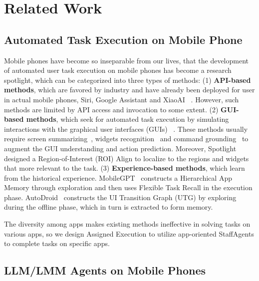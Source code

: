 \section{Related Work}
\subsection{Automated Task Execution on Mobile Phone}

Mobile phones have become so inseparable from our lives, that the development of automated user task execution on mobile phones has become a research spotlight, which can be categorized into three types of methods:
(1) \textbf{API-based methods}, which are favored by industry and have already been deployed for user in actual mobile phones, \eg Siri, Google Assistant and XiaoAI ~\cite{wen2023empowering}. However, such methods are limited by API access and invocation to some extent.
(2) \textbf{GUI-based methods}, which seek for automated task execution by simulating interactions with the graphical user interfaces (GUIs) ~\cite{li2020mapping, li2021learning, burns2022interactive, sun2022meta}. These methods usually require screen summarizing~\cite{wang2021screen2words, li2021screen2vec, zhang2021screen}, widgets recognition~\cite{li2020widget, chen2022towards} and command grounding~\cite{bai2021uibert, burns2022dataset} to augment the GUI understanding and action prediction. Moreover, Spotlight~\cite{li2023spotlight} designed a Region-of-Interest (ROI) Align to localize to the regions and widgets that more relevant to the task.
(3) \textbf{Experience-based methods}, which learn from the historical experience. MobileGPT~\cite{lee2023explore} constructs a Hierarchical App Memory through exploration and then uses Flexible Task Recall in the execution phase. AutoDroid~\cite{wen2024autodroid} constructs the UI Transition Graph (UTG) by exploring during the offline phase, which in turn is extracted to form memory.

The diversity among apps makes existing methods ineffective in solving tasks on various apps, so we design Assigned Execution to utilize app-oriented StaffAgents to complete tasks on specific apps.

\subsection{LLM/LMM Agents on Mobile Phones}

